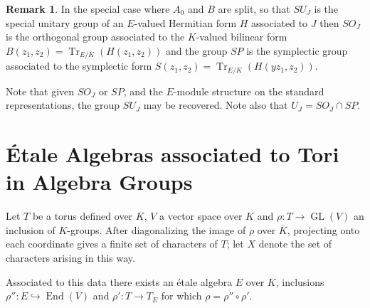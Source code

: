 \documentclass{article}
\theoremstyle{plain}
\theoremstyle{definition}
\newtheorem{remark}[theorem]{Remark}
\DeclareMathOperator{\Tr}{Tr}
\DeclareMathOperator{\End}{End}
\DeclareMathOperator{\GL}{GL}
\newcommand{\Kb}{\overline{K}}
\begin{document}
\begin{remark}
In the special case where $A_0$ and $B$ are split, so that $SU_J$ is the special unitary group of an $E$-valued Hermitian form $H$ associated to $J$ then
$SO_J$ is the orthogonal group associated to the $K$-valued bilinear form $B(z_1,z_2) = \Tr_{E/K}(H(z_1,z_2))$ and the group $SP$ is the symplectic group associated to the symplectic form $S(z_1,z_2) = \Tr_{E/K}(H(yz_1,z_2))$.

Note that given $SO_J$ or $SP$, and the $E$-module structure on the standard representations, the group $SU_J$ may be recovered.
Note also that $U_J = SO_J \cap SP$.
\end{remark}










\section{\'Etale Algebras  associated to Tori in Algebra Groups}

Let $T$ be a torus defined over $K$, $V$ a vector space over $K$ and $\rho : T \rightarrow \GL(V)$ an inclusion of $K$-groups.  After diagonalizing the image of $\rho$ over $\Kb$, projecting onto each coordinate gives a finite set of characters of $T$; let $X$ denote the set of characters arising in this way. 

Associated to this data there exists an \'etale algebra $E$ over $K$, inclusions $\rho'' : E \hookrightarrow \End(V)$ and $\rho' : T \rightarrow T_E$ for which $\rho = \rho''\circ\rho'$.
\end{document}
